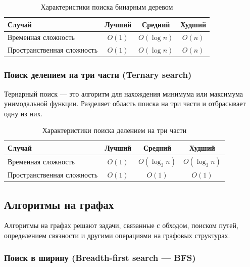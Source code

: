 \documentclass[a4paper,12pt]{article}
\begin{document}
\begin{table}[H]
    \centering
    \begin{tabular}{|l|c|c|c|}
        \hline
        Случай & Лучший & Средний & Худший \\
        \hline
        Временная сложность & $O(1)$ & $O(\log n)$ & $O(n)$ \\
        \hline
        Пространственная сложность & $O(1)$ & $O(\log n)$ & $O(n)$ \\
        \hline
    \end{tabular}
    \caption{Характеристики поиска бинарным деревом}
\end{table}

\subsubsection{Поиск делением на три части (Ternary search)}
\label{subsubsec:поиск-делением-на-три-части-ternary-search}

Тернарный поиск --- это алгоритм для нахождения минимума или максимума унимодальной функции. Разделяет область поиска на три части и отбрасывает одну из них.

\begin{table}[H]
    \centering
    \begin{tabular}{|l|c|c|c|}
        \hline
        Случай & Лучший & Средний & Худший \\
        \hline
        Временная сложность & $O(1)$ & $O(\log_3 n)$ & $O(\log_3 n)$ \\
        \hline
        Пространственная сложность & $O(1)$ & $O(1)$ & $O(1)$ \\
        \hline
    \end{tabular}
    \caption{Характеристики поиска делением на три части}
\end{table}

\subsection{Алгоритмы на графах}
\label{subsec:алгоритмы-на-графах}

Алгоритмы на графах решают задачи, связанные с обходом, поиском путей, определением связности и другими операциями на графовых структурах.

\subsubsection{Поиск в ширину (Breadth-first search — BFS)}
\label{subsubsec:поиск-в-ширину-breadth-first-search-bfs}
\end{document}
